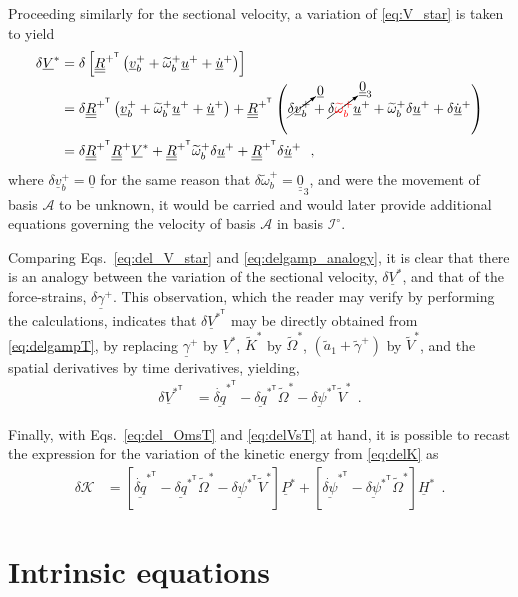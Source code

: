 \documentclass[12pt,a4paper,oneside,english]{abntex2} %
\newcommand{\fix}[1]{{\color{red}#1}}
\newcommand{\vect}[1]{\underline{#1}}
\def\tens#1{\underline{\underline{#1}}}
\def\til#1{\widetilde{#1}}
\def\lb{\left[}
\def\rb{\right]}
\def\lp{\left(}
\def\rp{\right)}
\def\T{\mathsf{T}}
\def\A{\mathcal{A}}
\def\Io{\mathcal{I}^{\circ}}
\def\zthree{\tens{0}_3}
\def\aonetil{\til{a}_1}
\def\R{\tens{R}}
\def\Rp{\R^+}
\def\RpT{\R^{+^\T}}
\def\u{\vect{u}}
\def\uplus{\u^{+}}
\def\updot{\dot{\u}^{+}}
\def\vb{\vect{v}_b}
\def\vbplus{\vb^{+}}
\def\omtil{\til{\omega}_b}
\def\omtilp{\omtil^{+}}
\def\gam{\vect{\gamma}}
\def\gamp{\gam^{+}}
\def\gamptil{\til{\gamma}^{+}}
\def\Ktil{\til{K}}
\def\Ktils{\Ktil^{*}}
\def\V{\vect{V}}
\def\Vs{\V^{*}}
\def\VsT{\V^{*^\T}}
\def\Vtils{\til{V}^{*}}
\def\Omtil{\til{\Omega}}
\def\Omtils{\Omtil^{*}}
\def\P{\vect{P}}
\def\Ps{\P^*}
\def\Hv{\vect{H}}
\def\Hvs{\Hv^*}
\def\delq{\vect{\delta q}}
\def\delqdotsT{\dot{\delq}^{*^\T}}
\def\delqsT{\delq^{*^\T}}
\def\delpsi{\vect{\delta\psi}}
\def\delpsisT{\delpsi^{*^\T}}
\def\delpsidot{\dot{\delpsi}}
\def\delpsisdotT{\delpsidot^{*^\T}}
\def\zv{\vect{0}}
\begin{document}
\begin{apendicesenv}
Proceeding similarly for the sectional velocity, a variation of \cref{eq:V_star} is taken to yield
\begin{align}
    \delta\Vs &= \delta\lb \RpT \lp\vbplus + \omtilp\uplus + \updot\rp \rb \nonumber 
    \\
    &= \delta\RpT\lp\vbplus + \omtilp\uplus + \updot\rp + \RpT\lp\cancelto{\zv}{\delta\vbplus} + \cancelto{\zthree}{\delta\fix{\omtilp}}\uplus + \omtilp\delta\uplus + \delta\updot\rp \nonumber 
    \\
    &= \delta\RpT\Rp\Vs + \RpT\omtilp\delta\uplus + \RpT\delta\updot \ \ ,
    \label{eq:del_V_star}
\end{align}
where $\delta\vbplus = \vect{0}$ for the same reason that $\delta\omtilp = \zthree$, and were the movement of basis $\A$ to be unknown, it would be carried and would later provide additional equations governing the velocity of basis $\A$ in basis $\Io$. 

Comparing Eqs.~\eqref{eq:del_V_star} and \eqref{eq:delgamp_analogy}, it is clear that
there is an analogy between the variation of the sectional velocity, $\delta\Vs$, and that of the force-strains, $\delta\gamp$. This observation, which the reader may verify by performing the calculations, indicates that $\delta\VsT$ may be directly obtained from \cref{eq:delgampT}, by replacing $\gamp$ by $\Vs$, $\Ktils$ by $\Omtils$, $\lp\aonetil+\gamptil\rp$ by $\Vtils$, and the spatial derivatives by time derivatives, yielding,
\begin{align}
    \delta\VsT &= \delqdotsT - \delqsT\Omtils - \delpsisT\Vtils \ \ .
    \label{eq:delVsT}
\end{align}

Finally, with Eqs.~\eqref{eq:del_OmsT} and \eqref{eq:delVsT} at hand, it is possible to recast the expression for the variation of the kinetic energy from \cref{eq:delK} as
\begin{align}
    \delta\mathcal{K} &= \lb\delqdotsT - \delqsT\Omtils - \delpsisT\Vtils\rb\Ps + \lb\delpsisdotT - \delpsisT\Omtils\rb\Hvs \ \ .
    \label{eq:delK_final}
\end{align}

\section{Intrinsic equations}
\label{sec:intrinsic_eq}


\end{apendicesenv}
\end{document}
